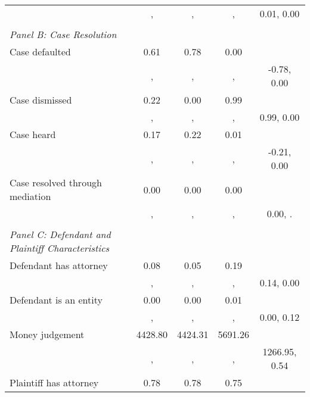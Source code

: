 \begin{table}[htbp]
\begin{tabular}{l*{4}{c}}
                    &          , &          , &          , &  0.01, 0.00\\
\vspace{0.1em} \\ \emph{Panel B: Case Resolution}&            &            &            &            \\
\hspace{0.25cm}Case defaulted&        0.61&        0.78&        0.00&            \\
                    &          , &          , &          , & -0.78, 0.00\\
\hspace{0.25cm}Case dismissed&        0.22&        0.00&        0.99&            \\
                    &          , &          , &          , &  0.99, 0.00\\
\hspace{0.25cm}Case heard&        0.17&        0.22&        0.01&            \\
                    &          , &          , &          , & -0.21, 0.00\\
\hspace{0.25cm}Case resolved through mediation&        0.00&        0.00&        0.00&            \\
                    &          , &          , &          , &     0.00, .\\
\vspace{0.1em} \\ \emph{Panel C: Defendant and Plaintiff Characteristics}&            &            &            &            \\
\hspace{0.25cm}Defendant has attorney&        0.08&        0.05&        0.19&            \\
                    &          , &          , &          , &  0.14, 0.00\\
\hspace{0.25cm}Defendant is an entity&        0.00&        0.00&        0.01&            \\
                    &          , &          , &          , &  0.00, 0.12\\
\hspace{0.25cm}Money judgement&     4428.80&     4424.31&     5691.26&            \\
                    &          , &          , &          , &1266.95, 0.54\\
\hspace{0.25cm}Plaintiff has attorney&        0.78&        0.78&        0.75&            \\

\end{tabular}
\end{table}
